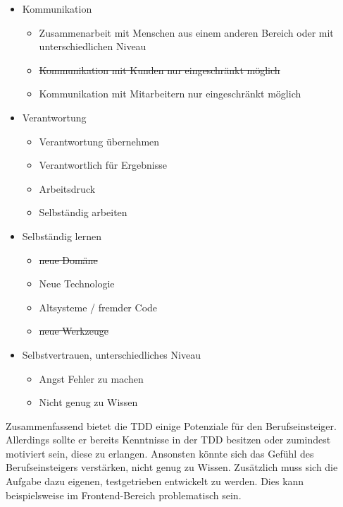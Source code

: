 \begin{itemize}
\item Kommunikation
\begin{itemize}
  \item Zusammenarbeit mit Menschen aus einem anderen Bereich oder mit unterschiedlichen Niveau \checkmark
  \item \sout{Kommunikation mit Kunden nur eingeschränkt möglich}
  \item Kommunikation mit Mitarbeitern nur eingeschränkt möglich \checkmark
\end{itemize}
\item Verantwortung
\begin{itemize}
  \item Verantwortung übernehmen \checkmark
  \item Verantwortlich für Ergebnisse \checkmark
  \item Arbeitsdruck \checkmark
  \item Selbständig arbeiten \checkmark
\end{itemize}
\item Selbständig lernen
\begin{itemize}
  \item \sout{neue Domäne}
  \item Neue Technologie \checkmark
  \item Altsysteme / fremder Code \checkmark
  \item \sout{neue Werkzeuge}
\end{itemize}
\item Selbstvertrauen, unterschiedliches Niveau
\begin{itemize}
  \item Angst Fehler zu machen \checkmark
  \item Nicht genug zu Wissen \danger
\end{itemize}
\end{itemize}

Zusammenfassend bietet die TDD einige Potenziale für den Berufseinsteiger. Allerdings sollte er bereits Kenntnisse in der TDD besitzen oder zumindest motiviert sein, diese zu erlangen. Ansonsten könnte sich das Gefühl des Berufseinsteigers verstärken, nicht genug zu Wissen. Zusätzlich muss sich die Aufgabe dazu eigenen, testgetrieben entwickelt zu werden. Dies kann beispielsweise im Frontend-Bereich problematisch sein. %
